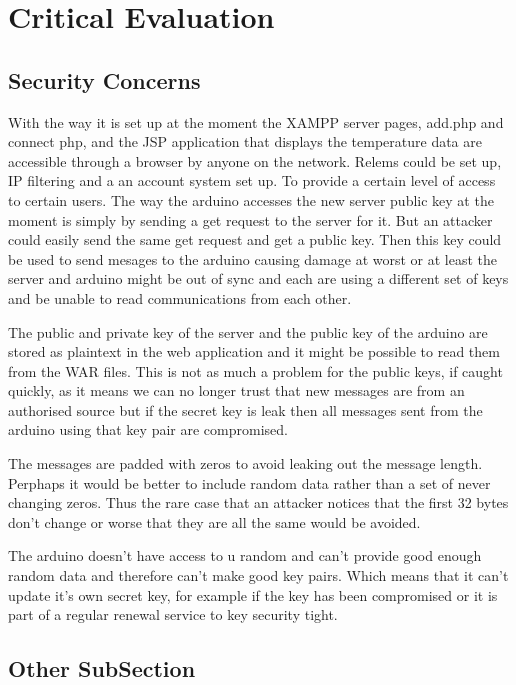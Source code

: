 \chapter{Critical Evaluation}
\label{crit}




\section{Security Concerns}

With the way it is set up at the moment the XAMPP server pages, add.php and connect php, and the JSP application that displays the temperature data are accessible through a browser by anyone on the network. Relems could be set up, IP filtering and a an account system set up. To provide a certain level of access to certain users. 
The way the arduino accesses the new server public key at the moment is simply by sending a get request to the server for it. But an attacker could easily send the same get request and get a public key. Then this key could be used to send mesages to the arduino causing damage at worst or at least the server and arduino might be out of sync and each are using a different set of keys and be unable to read communications from each other.

The public and private key of the server and the public key of the arduino are stored as plaintext in the web application and it might be possible to read them from the WAR files. This is not as much a problem for the public keys, if caught quickly, as it means we can no longer trust that new messages are from an authorised source but if the secret key is leak then all messages sent from the arduino using that key pair are compromised. 

The messages are padded with zeros to avoid leaking out the message length. Perphaps it would be better to include random data rather than a set of never changing zeros. Thus the rare case that an attacker notices that the first 32 bytes don't change or worse that they are all the same would be avoided.

The arduino doesn't have access to u random and can't provide good enough random data and therefore can't make good key pairs. Which means that it can't update it's own secret key, for example if the key has been compromised or it is part of a regular renewal service to key security tight.

\section{Other SubSection}

